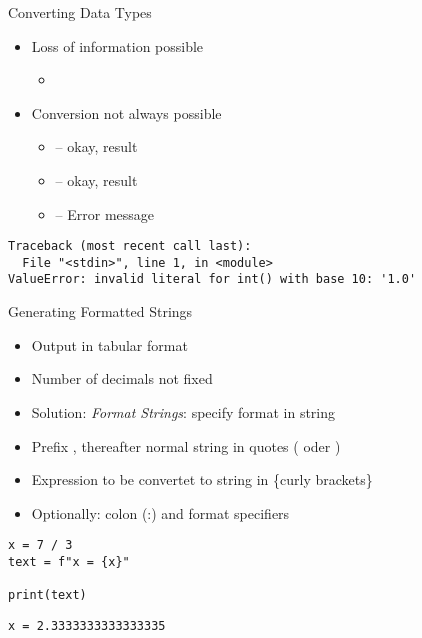 \begin{frame}[fragile]{Converting Data Types}
%
\begin{itemize}
\item Loss of information possible
	\begin{itemize}
	\item {} \thus~ 
	\end{itemize}
\item Conversion not always possible
	\begin{itemize}
	\item {} -- okay, result 
	\item {} -- okay, result 
	\item  {} -- Error message
	\end{itemize}
\end{itemize}
%
\begin{cmdbox}
\begin{verbatim}
Traceback (most recent call last):
  File "<stdin>", line 1, in <module>
ValueError: invalid literal for int() with base 10: '1.0'
\end{verbatim}
\end{cmdbox}
%
\end{frame}


\begin{frame}[fragile]{Generating Formatted Strings}
%
\begin{itemize}
\item Output in tabular format
\item Number of decimals not fixed
\item Solution: \emph{Format Strings}: specify format in string
\item Prefix , thereafter normal string in quotes ( oder )
\item Expression to be convertet to string in \{curly brackets\}
\item Optionally: colon (:) and format specifiers
\end{itemize}
%
\begin{codebox}[Code: Format Strings (1), width=.5\linewidth, nobeforeafter, equal height group = grpFormatString1]
\begin{verbatim}
x = 7 / 3
text = f"x = {x}"

print(text)
\end{verbatim}
\end{codebox}
%
\begin{cmdbox}[Output: Format Strings (1), width=.49\linewidth, nobeforeafter, equal height group = grpFormatString1]
\begin{verbatim}
x = 2.3333333333333335
\end{verbatim}
\end{cmdbox}
%
\end{frame}

